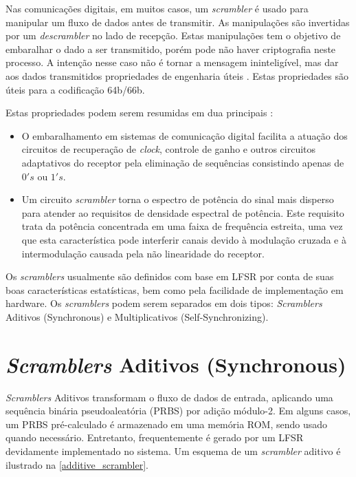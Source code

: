 Nas comunicações digitais, em muitos casos, um \textit{scrambler} é usado para manipular um fluxo de dados antes de transmitir. As manipulações são invertidas por um \textit{descrambler} no lado de recepção. Estas manipulações tem o objetivo de embaralhar o dado a ser transmitido, porém pode não haver criptografia neste processo. A intenção nesse caso não é tornar a mensagem ininteligível, mas dar aos dados transmitidos propriedades de engenharia úteis \cite{Ghassan2018}. Estas propriedades são úteis para a codificação 64b/66b.

Estas propriedades podem serem resumidas em dua principais \cite{Ghassan2018}:

\begin{itemize}
	\item O embaralhamento em sistemas de comunicação digital facilita a atuação dos circuitos de recuperação de \textit{clock}, controle de ganho e outros circuitos adaptativos do receptor pela eliminação de sequências consistindo apenas de $0's$ ou $1's$.
	\item Um circuito \textit{scrambler} torna o espectro de potência do sinal mais disperso para atender ao requisitos de densidade espectral de potência. Este requisito trata da potência concentrada em uma faixa de frequência estreita, uma vez que esta característica pode interferir canais devido à modulação cruzada e à intermodulação causada 	pela não linearidade do receptor.
\end{itemize}

Os \textit{scramblers} usualmente são definidos com base em LFSR por conta de suas boas características estatísticas, bem como pela facilidade de implementação em hardware. Os \textit{scramblers} podem serem separados em dois tipos: \textit{Scramblers} Aditivos (Synchronous) e Multiplicativos (Self-Synchronizing).

\section{\textit{Scramblers} Aditivos (Synchronous)}

\textit{Scramblers} Aditivos transformam o fluxo de dados de entrada, aplicando uma sequência binária pseudoaleatória (PRBS) por adição módulo-2. Em alguns casos, um PRBS pré-calculado é armazenado em uma memória ROM, sendo usado quando necessário. Entretanto, frequentemente é gerado por um LFSR devidamente implementado no sistema. Um esquema de um \textit{scrambler} aditivo é ilustrado na \autoref{additive_scrambler}.

